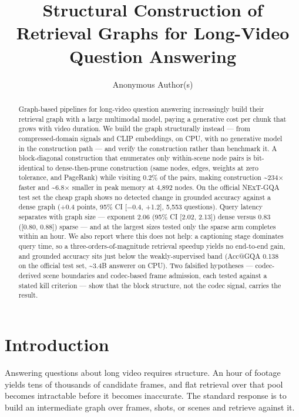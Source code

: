 \documentclass[sigconf,review,anonymous]{acmart}
\begin{document}
\title{Structural Construction of Retrieval Graphs for Long-Video Question Answering}
\author{Anonymous Author(s)}
\begin{abstract}
Graph-based pipelines for long-video question answering increasingly build their retrieval
graph with a large multimodal model, paying a generative cost per chunk that grows with
video duration. We build the graph structurally instead --- from compressed-domain signals and
CLIP embeddings, on CPU, with no generative model in the construction path --- and verify the
construction rather than benchmark it. A block-diagonal construction that enumerates only
within-scene node pairs is bit-identical to dense-then-prune construction (same nodes,
edges, weights at zero tolerance, and PageRank) while visiting 0.2\% of the pairs, making
construction \textasciitilde234\ensuremath{\times} faster and \textasciitilde6.8\ensuremath{\times} smaller in peak memory at 4,892 nodes. On the official
NExT-GQA test set the cheap graph shows no detected change in grounded accuracy against a dense
graph (+0.4 points, 95\% CI {[}\ensuremath{-}0.4, +1.2{]}, 5,553 questions). Query latency
separates with graph size --- exponent 2.06 (95\% CI {[}2.02, 2.13{]}) dense versus 0.83
({[}0.80, 0.88{]}) sparse --- and at the largest sizes tested only the sparse arm completes
within an hour. We also report where this does not help: a captioning stage dominates query time,
so a three-orders-of-magnitude retrieval speedup yields no end-to-end gain, and grounded
accuracy sits just below the weakly-supervised band (Acc@GQA 0.138 on the official test set,
\textasciitilde3.4B answerer on CPU). Two falsified hypotheses --- codec-derived scene boundaries and codec-based
frame admission, each tested against a stated kill criterion --- show that the block
structure, not the codec signal, carries the result.
\end{abstract}
\maketitle
\section{Introduction}

Answering questions about long video requires structure. An hour of footage yields tens of
thousands of candidate frames, and flat retrieval over that pool becomes intractable before
it becomes inaccurate. The standard response is to build an intermediate graph over frames,
shots, or scenes and retrieve against it.
\end{document}
